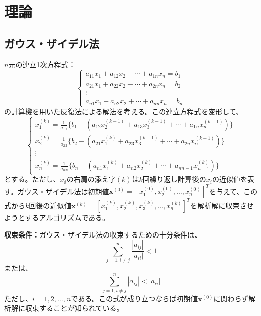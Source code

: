 \documentclass[12pt,a4paper]{ltjsreport}
\begin{document}
\section{理論}

\subsection{ガウス・ザイデル法}

$n$元の連立1次方程式：
\begin{equation}
\begin{cases}
a_{11}x_1 + a_{12}x_2 + \cdots + a_{1n}x_n = b_1 \\
a_{21}x_1 + a_{22}x_2 + \cdots + a_{2n}x_n = b_2 \\
\vdots \\
a_{n1}x_1 + a_{n2}x_2 + \cdots + a_{nn}x_n = b_n
\end{cases}
\end{equation}
の計算機を用いた反復法による解法を考える。この連立方程式を変形して、
\begin{equation}
\begin{cases}
x_1^{(k)} = \frac{1}{a_{11}}\{b_1 - (a_{12}x_2^{(k-1)} + a_{13}x_3^{(k-1)} + \cdots + a_{1n}x_n^{(k-1)})\} \\
x_2^{(k)} = \frac{1}{a_{22}}\{b_2 - (a_{21}x_1^{(k)} + a_{23}x_3^{(k-1)} + \cdots + a_{2n}x_n^{(k-1)})\} \\
\vdots \\
x_n^{(k)} = \frac{1}{a_{nn}}\{b_n - (a_{n1}x_1^{(k)} + a_{n2}x_2^{(k)} + \cdots + a_{nn-1}x_{n-1}^{(k)})\}
\end{cases}
\end{equation}
とする。ただし、$x_i$の右肩の添え字$(k)$は$k$回繰り返し計算後の$x_i$の近似値を表す。ガウス・ザイデル法は初期値$\boldsymbol{x}^{(0)} = [x_1^{(0)}, x_2^{(0)}, \ldots, x_n^{(0)}]^T$を与えて、この式から$k$回後の近似値$\boldsymbol{x}^{(k)} = [x_1^{(k)}, x_2^{(k)}, x_3^{(k)}, \ldots, x_n^{(k)}]^T$を解析解に収束させようとするアルゴリズムである。

\textbf{収束条件：}ガウス・ザイデル法の収束するための十分条件は、
\begin{equation}
\sum_{j=1, i\neq j}^{n} \frac{|a_{ij}|}{|a_{ii}|} < 1
\end{equation}
または、
\begin{equation}
\sum_{j=1, i\neq j}^{n} |a_{ij}| < |a_{ii}|
\end{equation}
ただし、$i = 1, 2, \ldots, n$である。この式が成り立つならば初期値$\boldsymbol{x}^{(0)}$に関わらず解析解に収束することが知られている。
\end{document}
